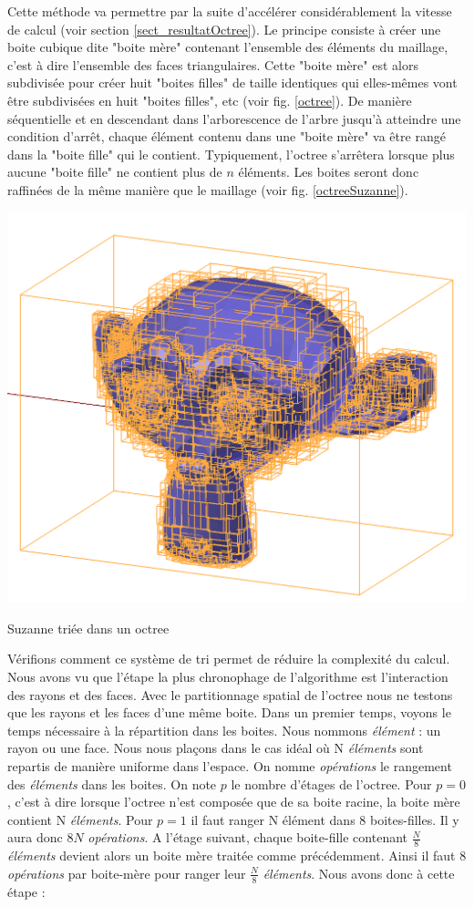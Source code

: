 Cette méthode va permettre par la suite d'accélérer considérablement la vitesse de calcul \cite[p. 5]{octree} (voir section \ref{sect_resultatOctree}). Le principe consiste à créer une boite cubique dite "boite mère" contenant l'ensemble des éléments du maillage, c'est à dire l'ensemble des faces triangulaires. Cette "boite mère" est alors subdivisée pour créer huit "boites filles" de taille identiques qui elles-mêmes vont être subdivisées en huit "boites filles", etc (voir fig. \ref{octree}). De manière séquentielle et en descendant dans l'arborescence de l'arbre jusqu'à atteindre une condition d'arrêt, chaque élément contenu dans une "boite mère" va être rangé dans la "boite fille" qui le contient. Typiquement, l'\gls{octree} s'arrêtera lorsque plus aucune "boite fille" ne contient plus de $n$ éléments. Les boites seront donc raffinées de la même manière que le maillage (voir fig. \ref{octreeSuzanne}).

\begin{figureth}
	\includegraphics[width=0.6\linewidth]{images/octreeSuzanne}
	\caption{Suzanne triée dans un \gls{octree}}
	\label{octreeSuzanne}
\end{figureth}

Vérifions comment ce système de tri permet de réduire la complexité du calcul. Nous avons vu que l'étape la plus chronophage de l'algorithme est l'interaction des rayons et des faces. Avec le partitionnage spatial de l'\gls{octree} nous ne testons que les rayons et les faces d'une même boite. Dans un premier temps, voyons le temps nécessaire à la répartition dans les boites. Nous nommons \textit{élément} : un rayon ou une face. Nous nous plaçons dans le cas idéal où N \textit{éléments} sont repartis de manière uniforme dans l'espace. On nomme \textit{opérations} le rangement des \textit{éléments} dans les boites. On note $p$ le nombre d'étages de l'\gls{octree}. Pour $p=0$, c'est à dire lorsque l'\gls{octree} n'est composée que de sa boite racine, la boite mère contient N \textit{éléments}. Pour $p=1$ il faut ranger N élément dans 8 boites-filles. Il y aura donc $8N$ \textit{opérations}. A l'étage suivant, chaque boite-fille contenant $\frac{N}{8}$ \textit{éléments} devient alors un boite mère traitée comme précédemment. Ainsi il faut $8$ \textit{opérations} par boite-mère pour ranger leur $\frac{N}{8}$ \textit{éléments}. Nous avons donc à cette étape :

